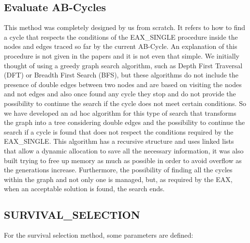 \subsection{Evaluate AB-Cycles}
This method was completely designed by us from scratch. It refers to how to find a cycle that respects the conditions of the EAX\_SINGLE procedure inside the nodes and edges traced so far by the current AB-Cycle. An explanation of this procedure is not given in the papers \cite{Nagata2013, Honda2013} and it is not even that simple. We initially thought of using a greedy graph search algorithm, such as Depth First Traversal (DFT) or Breadth First Search (BFS), but these algorithms do not include the presence of double edges between two nodes and are based on visiting the nodes and not edges and also once found any cycle they stop and do not provide the possibility to continue the search if the cycle does not meet certain conditions. So we have developed an ad hoc algorithm for this type of search that transforms the graph into a tree considering double edges and the possibility to continue the search if a cycle is found that does not respect the conditions required by the EAX\_SINGLE. This algorithm has a recursive structure and uses linked lists that allow a dynamic allocation to save all the necessary information, it was also built trying to free up memory as much as possible in order to avoid overflow as the generations increase. Furthermore, the possibility of finding all the cycles within the graph and not only one is managed, but, as required by the EAX, when an acceptable solution is found, the search ends.

\subsection{SURVIVAL\_SELECTION}
For the survival selection method, some parameters are defined: 

